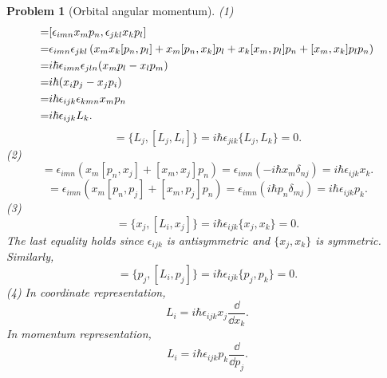 \documentclass{article}
\theoremstyle{1}
\newtheorem{problem}{Problem}
\begin{document}
\begin{problem}[Orbital angular momentum]\label{4}
    (1) \begin{align}
        [L_i,L_j]=&[\epsilon_{imn}x_mp_n,\epsilon_{jkl}x_kp_l]\notag\\
        =&\epsilon_{imn}\epsilon_{jkl}\left(x_mx_k[p_n,p_l]+x_m[p_n,x_k]p_l+x_k[x_m,p_l]p_n+[x_m,x_k]p_lp_n\right)\notag\\
        =&i\hbar\epsilon_{imn}\epsilon_{jln}(x_mp_l-x_lp_m)\notag\\
        =&i\hbar (x_ip_j-x_jp_i)\notag\\
        =&i\hbar \epsilon_{ijk}\epsilon_{kmn}x_mp_n\notag\\
        =&i\hbar \epsilon_{ijk}L_k.
    \end{align}
    \begin{equation}
        [L_jL_j,L_i]=\{L_j,[L_j,L_i]\}=i\hbar\epsilon_{jik}\{L_j,L_k\}=0.
    \end{equation}
    (2) \begin{equation}
        [L_i,x_j]=\epsilon_{imn}\left(x_m[p_n,x_j]+[x_m,x_j]p_n\right)=\epsilon_{imn}\left(-i\hbar x_m\delta_{nj}\right)=i\hbar\epsilon_{ijk}x_k.
    \end{equation}
    \begin{equation}
        [L_i,p_j]=\epsilon_{imn}\left(x_m[p_n,p_j]+[x_m,p_j]p_n\right)=\epsilon_{imn}\left(i\hbar p_n\delta_{mj}\right)=i\hbar\epsilon_{ijk}p_k.
    \end{equation}
    (3) \begin{equation}
        [L_i,x_j x_j]=\{x_j,[L_i,x_j]\}=i\hbar\epsilon_{ijk}\{x_j,x_k\}=0.
    \end{equation}
    The last equality holds since $\epsilon_{ijk}$ is antisymmetric and $\{x_j,x_k\}$ is symmetric. Similarly,
    \begin{equation}
        [L_i,p_j p_j]=\{p_j,[L_i,p_j]\}=i\hbar\epsilon_{ijk}\{p_j,p_k\}=0.
    \end{equation}
    (4) In coordinate representation, 
    \begin{equation}
        L_i=i\hbar\epsilon_{ijk}x_j\frac{\dd}{\dd{x_k}}.
    \end{equation}
    In momentum representation,
    \begin{equation}
        L_i=i\hbar\epsilon_{ijk}p_k\frac{\dd}{\dd{p_j}}.
    \end{equation}
\end{problem}
\end{document}
